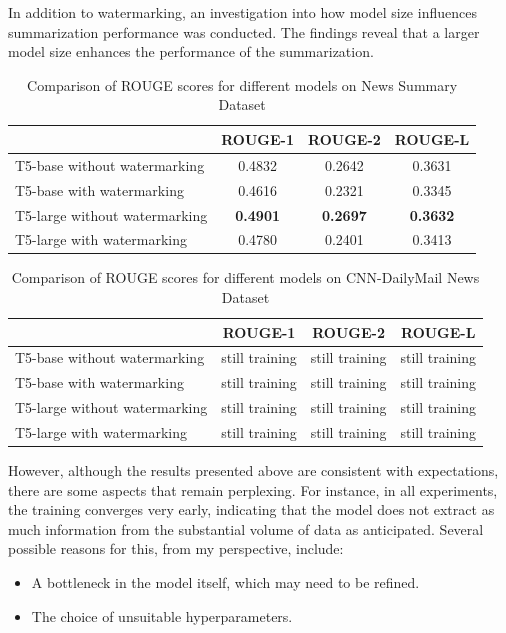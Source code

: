 \documentclass{article}
\begin{document}
In addition to watermarking, an investigation into how model size influences summarization performance was conducted. The findings reveal that a larger model size enhances the performance of the summarization.

\begin{table}[h]
	\centering
	\begin{tabular}{lccc}
		\hline
		& ROUGE-1 & ROUGE-2 & ROUGE-L \\
		\hline
		T5-base without watermarking  &  0.4832 &  0.2642 &  0.3631 \\
		T5-base with watermarking     &  0.4616 &  0.2321 &  0.3345 \\
		T5-large without watermarking &  \textbf{0.4901} &  \textbf{0.2697} &  \textbf{0.3632} \\
		T5-large with watermarking    &  0.4780 &  0.2401 &  0.3413 \\
		\hline
	\end{tabular}
	\caption{Comparison of ROUGE scores for different models on News Summary Dataset}
	\label{tab:rouge-scores_news}
\end{table}

\begin{table}[h]
	\centering
	\begin{tabular}{lccc}
		\hline
		& ROUGE-1 & ROUGE-2 & ROUGE-L \\
		\hline
		T5-base without watermarking  &  still training &  still training &  still training \\
		T5-base with watermarking     &  still training &  still training &  still training \\
		T5-large without watermarking &  still training &  still training &  still training \\
		T5-large with watermarking    &  still training &  still training &  still training \\
		\hline
	\end{tabular}
	\caption{Comparison of ROUGE scores for different models on CNN-DailyMail News Dataset}
	\label{tab:rouge-scores_cnn}
\end{table}

However, although the results presented above are consistent with expectations, there are some aspects that remain perplexing. For instance, in all experiments, the training converges very early, indicating that the model does not extract as much information from the substantial volume of data as anticipated. Several possible reasons for this, from my perspective, include:
\begin{itemize}
	\item A bottleneck in the model itself, which may need to be refined.
	\item The choice of unsuitable hyperparameters.
\end{itemize}
\end{document}
